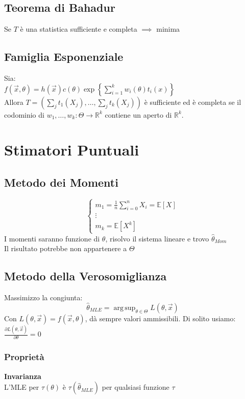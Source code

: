 \documentclass[a4paper,notitlepage]{report}%
\newcommand{\R}{\mathbb{R}}%
\newcommand{\E}{\mathbb{E}} %
\DeclareMathOperator*{\argsup}{arg\,sup} %
\begin{document}
\begin{multicols*}{2}
    
    \subsection*{Teorema di Bahadur}
    Se $T$ è una statistica sufficiente e completa $\implies$ minima


    \subsection*{Famiglia Esponenziale}
    Sia:\\
    $f(\vec{x},\theta) = h(\vec{x}) c(\theta) \exp\left\{ \sum_{i=1}^k w_i(\theta) t_i(x) \right\}$ \\
    Allora $T=(\sum_j t_1(X_j), \dots, \sum_j t_k(X_j) )$ è sufficiente
    ed è completa se il codominio di $w_1,\dots,w_k: \Theta \to \R^k$
    contiene un aperto di $\R^k$.
    
    
\section*{Stimatori Puntuali}


    \subsection*{Metodo dei Momenti}
    \[
        \left\{\begin{array}{l}
            m_1 = \frac{1}{n}\sum_{i=0}^n X_i = \E[X] \\
            \vdots \\
            m_k = \E[X^k]
        \end{array}\right.
    \]
    I momenti saranno funzione di $\theta$, risolvo il sistema lineare
    e trovo $\hat{\theta}_{Mom}$\\
    Il risultato potrebbe non appartenere a $\Theta$


    \subsection*{Metodo della Verosomiglianza}
    Massimizzo la congiunta:\\
    \[
        \hat{\theta}_{MLE} = \argsup_{\theta\in\Theta} L(\theta,\vec{x})
    \]
    Con $L(\theta,\vec{x}) = f(\vec{x},\theta)$, dà sempre valori ammissibili.
    Di solito usiamo:\\
    $\frac{\partial L(\theta,\vec{x})}{\partial \theta} = 0$

        \subsubsection*{Proprietà}
            \textbf{Invarianza}\\
            L'MLE per $\tau(\theta)$ è $\tau(\hat{\theta}_{MLE})$
            per qualsiasi funzione $\tau$



\end{multicols*}
\end{document}
